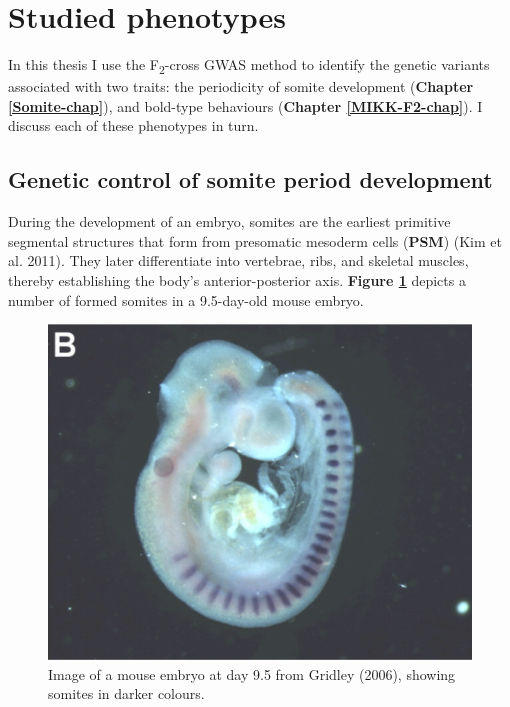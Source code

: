 \documentclass[
]{book}
\begin{document}
\hypertarget{studied-phenotypes}{%
\section{Studied phenotypes}\label{studied-phenotypes}}

In this thesis I use the F\textsubscript{2}-cross GWAS method to identify the genetic variants associated with two traits: the periodicity of somite development (\textbf{Chapter \ref{Somite-chap}}), and bold-type behaviours (\textbf{Chapter \ref{MIKK-F2-chap}}). I discuss each of these phenotypes in turn.

\hypertarget{genetic-control-of-somite-period-development}{%
\subsection{Genetic control of somite period development}\label{genetic-control-of-somite-period-development}}

During the development of an embryo, somites are the earliest primitive segmental structures that form from presomatic mesoderm cells (\textbf{PSM}) (Kim et al. 2011). They later differentiate into vertebrae, ribs, and skeletal muscles, thereby establishing the body's anterior-posterior axis. \textbf{Figure \ref{fig:mouse-embryo}} depicts a number of formed somites in a 9.5-day-old mouse embryo.



\begin{figure}

{\centering \includegraphics[width=0.6\linewidth]{figs/somites/mouse_embryo_gridley} 

}

\caption{Image of a mouse embryo at day 9.5 from Gridley (2006), showing somites in darker colours.}\label{fig:mouse-embryo}
\end{figure}
\end{document}
